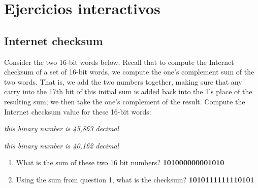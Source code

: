 \section*{Ejercicios interactivos}

\subsection*{Internet checksum}
\noindent Consider the two 16-bit words below. Recall that to compute the Internet checksum of a set of 16-bit words, we compute the one's complement sum of the two words.
That is, we add the two numbers together, making sure that any carry into the 17th bit of this initial sum is added back into the 1's place of the resulting sum; we then
take the one's complement of the result. Compute the Internet checksum value for these 16-bit words:
\begin{description}
    \centering
    \item[10110011 00100111] \textit{this binary number is 45,863 decimal}
    \item[10011100 11100010] \textit{this binary number is 40,162 decimal} 
\end{description}
\begin{enumerate}
    \item What is the sum of these two 16 bit numbers? \textbf{101000000001010}
    \item Using the sum from question 1, what is the checksum? \textbf{1010111111110101}
\end{enumerate}

